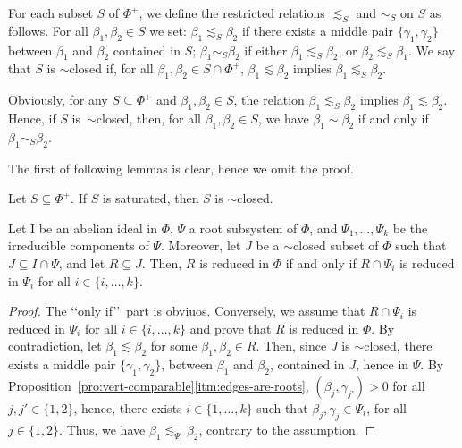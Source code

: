 \documentclass[ALCO,published]{cedram}
\theoremstyle{plain}
\newcommand\be{\beta}
\newcommand\ga{\gamma}
\begin{document}

\begin{defi} \label{def:restricted-sim}
For each subset  $S$ of $\Phi^+$, we define the restricted relations $\lesssim_S$ and $\sim_S$ on $S$ as follows.
For all $\be_1, \be_2\in S$ we set:  $\be_1 \lesssim_S \be_2$ if there exists a middle pair $\{\ga_1, \ga_2\}$ between $\be_1$ and $\be_2$ contained in $S$; 
 $\be_1 \sim_S \be_2$  if either $\be_1 \lesssim_S \be_2$, or $\be_2 \lesssim_S \be_1$.
We say that $S$ is  $\sim$closed if, for all $\be_1, \be_2\in S\cap \Phi^+$,   $\be_1 \lesssim\be_2$ implies   $\be_1 \lesssim_S  \be_2$. 
\end{defi}

Obviously, for any $S\subseteq \Phi^+$ and $\be_1, \be_2\in S$, the relation $\be_1 \lesssim_S \be_2$ implies $\be_1 \lesssim \be_2$.
Hence, if $S$ is~$\sim$closed, then, for all  $\be_1, \be_2\in S$, we have $\be_1\sim\be_2$ if and only if $\be_1\sim_S\be_2$.

The first of following lemmas is clear, hence we omit the proof.

\begin{lem}\label{lem:saturated-are-simclosed}
Let $S\subseteq \Phi^+$. 
If $S$ is saturated, then $S$ is $\sim$closed.
\end{lem}

\begin{lem}\label{lem:reduced-component-wise}
Let I be an abelian ideal in $\Phi$, $\Psi$ a root subsystem of $\Phi$, and $\Psi_1, \dots, \Psi_k$ be the irreducible components of $\Psi$. 
Moreover, let $J$ be a $\sim$closed subset of $\Phi$ such that $J\subseteq I\cap \Psi$, and  let $R\subseteq J$.
Then, $R$ is reduced in $\Phi$ if and only if $R\cap \Psi_i$ is reduced in $\Psi_i$ for all $i\in \{i, \dots, k\}$.
\end{lem}

\begin{proof}
The \lq\lq only if\rq\rq\ part is obviuos. 
Conversely, we assume that $R\cap \Psi_i$ is reduced in $\Psi_i$ for all $i\in \{i, \dots, k\}$ and prove that $R$ is reduced in $\Phi$.
By contradiction, let $\be_1\lesssim \be_2$ for some $\be_1, \be_2\in R$. 
Then, since $J$ is $\sim$closed, there exists a middle pair $\{\ga_1, \ga_2\}$, between $\be_1$ and $\be_2$, contained in $J$, hence in $\Psi$. 
By Proposition~\ref{pro:vert-comparable}\ref{itm:edges-are-roots}, $(\be_j,\ga_{j'})>0$  for all $j,j'\in \{1, 2\}$, hence,  there exists $i\in \{1, \dots, k\}$ such that $\be_j,\ga_j\in \Psi_i$, for all $j\in \{1, 2\}$. 
Thus, we have $\be_1\lesssim_{\Psi_i}\be_2$, contrary to the assumption.
\end{proof}
\end{document}
